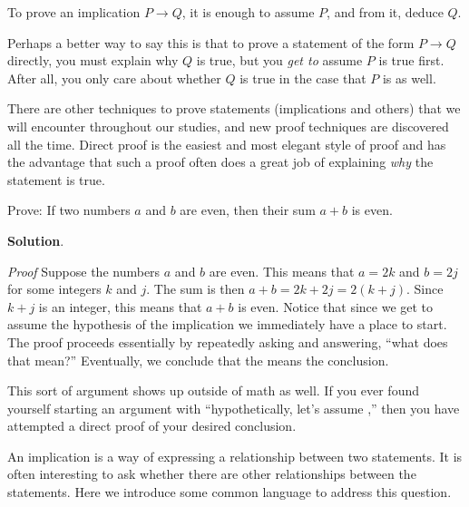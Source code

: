 \documentclass[11pt,]{book}
\makeatletter
\theoremstyle{ptxplainnotitle}
\theoremstyle{ptxplaintitle}
\renewcommand*{\proofname}{Proof}
\renewenvironment{proof}[1][\proofname]{\par
  \pushQED{\qed}%
  \normalfont \topsep6\p@\@plus6\p@\relax
  \trivlist
  \item\relax
    {\itshape
    #1\@addpunct{.}}\hspace\labelsep\ignorespaces
}{%
  \popQED\endtrivlist\@endpefalse
}
\theoremstyle{ptxdefinitionnotitle}
\theoremstyle{ptxdefinitiontitle}
\theoremstyle{ptxdefinitionnotitle}
\theoremstyle{ptxdefinitiontitle}
\theoremstyle{ptxdefinitionnotitle}
\theoremstyle{ptxdefinitiontitle}
\theoremstyle{ptxdefinitiontitlenonumber}
\theoremstyle{ptxdefinitiontitlenonumber}
\numberwithin{equation}{chapter}
\newcommand{\imp}{\rightarrow}
\makeatother
\begin{document}
\begin{assemblage}\label{assemblage-28}
\hypertarget{p-1827}{}%
To prove an implication \(P \imp Q\), it is enough to assume \(P\), and from it, deduce \(Q\).%
\end{assemblage}
\hypertarget{p-1828}{}%
Perhaps a better way to say this is that to prove a statement of the form \(P \imp Q\) directly, you must explain why \(Q\) is true, but you \emph{get to} assume \(P\) is true first.  After all, you only care about whether \(Q\) is true in the case that \(P\) is as well.%
\par
\hypertarget{p-1829}{}%
There are other techniques to prove statements (implications and others) that we will encounter throughout our studies, and new proof techniques are discovered all the time. Direct proof is the easiest and most elegant style of proof and has the advantage that such a proof often does a great job of explaining \emph{why} the statement is true.%
\begin{example}\label{example-50}
\hypertarget{p-1830}{}%
Prove: If two numbers \(a\) and \(b\) are even, then their sum \(a+b\) is even.%
\par\smallskip%
\noindent\textbf{Solution}.\hypertarget{solution-232}{}\quad%
\begin{proof}\hypertarget{proof-23}{}
\hypertarget{p-1831}{}%
Suppose the numbers \(a\) and \(b\) are even. This means that  \(a = 2k\) and \(b=2j\) for some integers \(k\) and \(j\). The sum is then \(a+b = 2k+2j = 2(k+j)\). Since \(k+j\) is an integer, this means that \(a+b\) is even.%
\end{proof}
\hypertarget{p-1832}{}%
Notice that since we get to assume the hypothesis of the implication we immediately have a place to start. The proof proceeds essentially by repeatedly asking and answering, ``what does that mean?''  Eventually, we conclude that the means the conclusion.%
\end{example}
\hypertarget{p-1833}{}%
This sort of argument shows up outside of math as well. If you ever found yourself starting an argument with ``hypothetically, let's assume \textellipsis{},'' then you have attempted a direct proof of your desired conclusion.%
\par
\hypertarget{p-1834}{}%
An implication is a way of expressing a relationship between two statements.  It is often interesting to ask whether there are other relationships between the statements.  Here we introduce some common language to address this question.%
\end{document}
